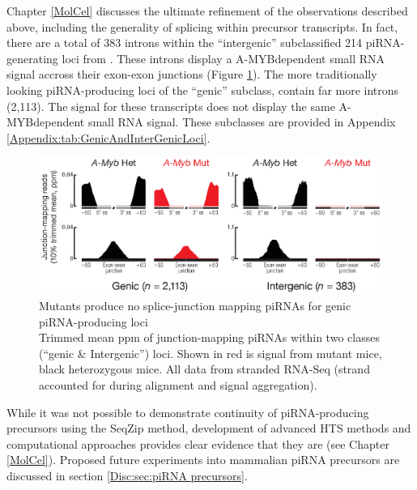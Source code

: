   Chapter \ref{MolCel} discusses the ultimate refinement of the observations described above, including the generality of splicing within precursor transcripts. In fact, there are a total of 383 introns within the ``intergenic'' subclassified 214 piRNA-generating loci from \citep{Li2013e}. These introns display a A-MYB\textendash dependent small RNA signal accross their exon-exon junctions (Figure \ref{SeqZipMethod:fig: amyb makes SJ mapping}). The more traditionally looking piRNA-producing loci of the ``genic'' subclass, contain far more introns (2,113). The signal for these transcripts does not display the same A-MYB\textendash dependent small RNA signal. These subclasses are provided in Appendix \ref{Appendix:tab:GenicAndInterGenicLoci}. 

  \begin{figure} %
    \centering 
    \includegraphics{Figures/SeqZipMethod/aggregatePiRNAsatSpliceJunctions.eps}
    \caption[\amyb{} Mutants produce no splice-junction mapping piRNAs for genic piRNA-producing loci]
    {
      \amyb{} Mutants produce no splice-junction mapping piRNAs for genic piRNA-producing loci\\[0.25cm]
      Trimmed mean ppm of junction-mapping piRNAs within two classes (``genic \& Intergenic'') loci. Shown in red is signal from \amyb{} mutant mice, black \amyb{} heterozygous mice. All data from stranded RNA-Seq (strand accounted for during alignment and signal aggregation).
      }
    \label{SeqZipMethod:fig: amyb makes SJ mapping}
    \end{figure}

  While it was not possible to demonstrate continuity of piRNA-producing precursors using the SeqZip method, development of advanced HTS methods and computational approaches provides clear evidence that they are (see Chapter \ref{MolCel}). Proposed future experiments into mammalian piRNA precursors are discussed in section \ref{Disc:sec:piRNA precursors}.

\cleardoublepage